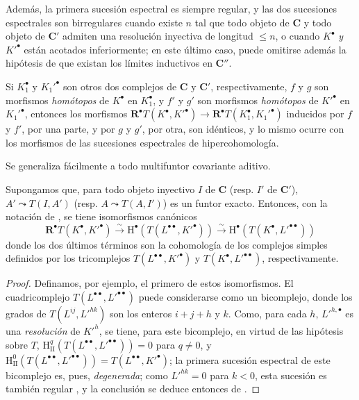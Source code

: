 \begin{env}[11.4.6]
Además, la primera sucesión espectral es siempre regular, y las dos sucesiones espectrales son birregulares cuando existe $n$ tal que todo objeto de $\boldsymbol{C}$ y todo objeto de $\boldsymbol{C}'$ admiten una resolución inyectiva de longitud $\leq n$, o cuando $K^\bullet$ \emph{y} $K'^\bullet$ están acotados inferiormente;
en este último caso, puede omitirse además la hipótesis de que existan los límites inductivos en $\boldsymbol{C}''$.

Si $K_1^\bullet$ y $K_1'^\bullet$ son otros dos complejos de $\boldsymbol{C}$ y $\boldsymbol{C}'$, respectivamente, $f$ y $g$ son morfismos \emph{homótopos} de $K^\bullet$ en $K_1^\bullet$,
y $f'$ y $g'$ son morfismos \emph{homótopos} de $K'^\bullet$ en $K_1'^\bullet$, entonces los morfismos $\mathbf R^\bullet T(K^\bullet,K'^\bullet)\to
\mathbf R^\bullet T(K_1^\bullet,K_1'^\bullet)$ inducidos por $f$ y $f'$, por una parte, y por $g$ y $g'$, por otra, son idénticos, y lo mismo ocurre con los morfismos de las sucesiones espectrales de hipercohomología.

Se generaliza fácilmente a todo multifuntor covariante aditivo.
\end{env}

\begin{proposition}[11.4.7]
\label{0.11.4.7}
\label{0.11.4.7-fr}
Supongamos que, para todo objeto inyectivo $I$ de $\boldsymbol{C}$ \textup{(resp.} $I'$ de $\boldsymbol{C}'$), $A'\leadsto T(I,A')$ \textup{(resp.} $A\leadsto T(A,I')$) es un funtor exacto.
Entonces, con la notación de \textup{}, se tiene isomorfismos canónicos
\[
  \label{0.11.4.7.1-fr}
  \mathbf R^\bullet T(K^\bullet,K'^\bullet)
  \xrightarrow{\sim}\mathrm H^\bullet(T(L^{\bullet\bullet},K'^\bullet))
  \xrightarrow{\sim}\mathrm H^\bullet(T(K^\bullet,L'^{\bullet\bullet}))
  \tag{11.4.7.1}
\]
donde los dos últimos términos son la cohomología de los complejos simples definidos por los tricomplejos $T(L^{\bullet\bullet},K'^\bullet)$ y $T(K^\bullet,L'^{\bullet\bullet})$, respectivamente.
\end{proposition}

\begin{proof}
Definamos, por ejemplo, el primero de estos isomorfismos.
El cuadricomplejo $T(L^{\bullet\bullet},L'^{\bullet\bullet})$ puede considerarse como un bicomplejo, donde los grados de $T(L^{ij},L'^{hk})$ son los enteros $i+j+h$ y $k$.
Como, para cada $h$, $L'^{h,\bullet}$ es una \emph{resolución} de $K'^h$, se tiene, para este bicomplejo, en virtud de las hipótesis sobre $T$, $\mathrm H_{\mathrm{II}}^q(T(L^{\bullet\bullet},L'^{\bullet\bullet}))=0$ para $q\neq0$, y $\mathrm H_{\mathrm{II}}^0(T(L^{\bullet\bullet},L'^{\bullet\bullet}))
=T(L^{\bullet\bullet},K'^\bullet)$;
la primera sucesión espectral de este bicomplejo es, pues, \emph{degenerada};
como $L'^{hk}=0$ para $k<0$, esta sucesión es también regular , y la conclusión se deduce entonces de .
\end{proof}

